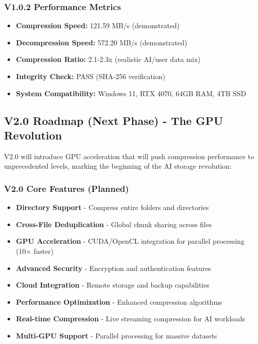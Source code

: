 \documentclass[11pt,a4paper]{article}
\begin{document}
	\subsubsection{V1.0.2 Performance Metrics}
	\begin{itemize}
		\item \textbf{Compression Speed:} 121.59 MB/s (demonstrated)
		\item \textbf{Decompression Speed:} 572.20 MB/s (demonstrated)
		\item \textbf{Compression Ratio:} 2.1-2.3x (realistic AI/user data mix)
		\item \textbf{Integrity Check:} PASS (SHA-256 verification)
		\item \textbf{System Compatibility:} Windows 11, RTX 4070, 64GB RAM, 4TB SSD
	\end{itemize}

	\subsection{V2.0 Roadmap (Next Phase) - The GPU Revolution}

	V2.0 will introduce GPU acceleration that will push compression performance to unprecedented levels, marking the beginning of the AI storage revolution:

	\subsubsection{V2.0 Core Features (Planned)}
	\begin{itemize}
		\item \textbf{Directory Support} - Compress entire folders and directories
		\item \textbf{Cross-File Deduplication} - Global chunk sharing across files
		\item \textbf{GPU Acceleration} - CUDA/OpenCL integration for parallel processing (10× faster)
		\item \textbf{Advanced Security} - Encryption and authentication features
		\item \textbf{Cloud Integration} - Remote storage and backup capabilities
		\item \textbf{Performance Optimization} - Enhanced compression algorithms
		\item \textbf{Real-time Compression} - Live streaming compression for AI workloads
		\item \textbf{Multi-GPU Support} - Parallel processing for massive datasets
	\end{itemize}
\end{document}

